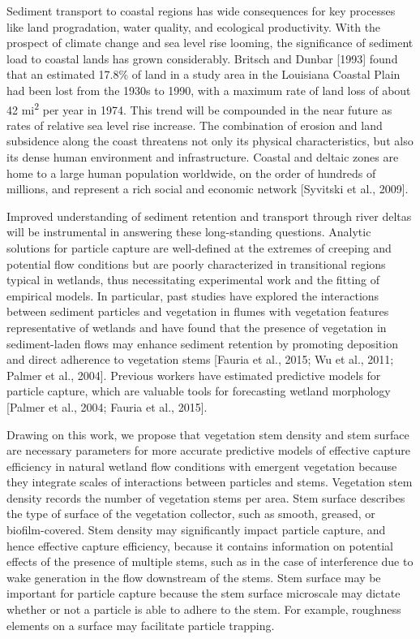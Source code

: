\documentclass[12pt]{article}
\begin{document}
Sediment transport to coastal regions has wide consequences for key processes like land progradation, water quality, and ecological productivity. With the prospect of climate change and sea level rise looming, the significance of sediment load to coastal lands has grown considerably. Britsch and Dunbar [1993] found that an estimated 17.8\% of land in a study area in the Louisiana Coastal Plain had been lost from the 1930s to 1990, with a maximum rate of land loss of about 42 mi\textsuperscript{2} per year in 1974. This trend will be compounded in the near future as rates of relative sea level rise increase. The combination of erosion and land subsidence along the coast threatens not only its physical characteristics, but also its dense human environment and infrastructure. Coastal and deltaic zones are home to a large human population worldwide, on the order of hundreds of millions, and represent a rich social and economic network [Syvitski et al., 2009].

Improved understanding of sediment retention and transport through river deltas will be instrumental in answering these long-standing questions. Analytic solutions for particle capture are well-defined at the extremes of creeping and potential flow conditions but are poorly characterized in transitional regions typical in wetlands, thus necessitating experimental work and the fitting of empirical models. In particular, past studies have explored the interactions between sediment particles and vegetation in flumes with vegetation features representative of wetlands and have found that the presence of vegetation in sediment-laden flows may enhance sediment retention by promoting deposition and direct adherence to vegetation stems [Fauria et al., 2015; Wu et al., 2011; Palmer et al., 2004]. Previous workers have estimated predictive models for particle capture, which are valuable tools for forecasting wetland morphology [Palmer et al., 2004; Fauria et al., 2015].

Drawing on this work, we propose that vegetation stem density and stem surface are necessary parameters for more accurate predictive models of effective capture efficiency in natural wetland flow conditions with emergent vegetation because they integrate scales of interactions between particles and stems. Vegetation stem density records the number of vegetation stems per area. Stem surface describes the type of surface of the vegetation collector, such as smooth, greased, or biofilm-covered. Stem density may significantly impact particle capture, and hence effective capture efficiency, because it contains information on potential effects of the presence of multiple stems, such as in the case of interference due to wake generation in the flow downstream of the stems. Stem surface may be important for particle capture because the stem surface microscale may dictate whether or not a particle is able to adhere to the stem. For example, roughness elements on a surface may facilitate particle trapping.
\end{document}
